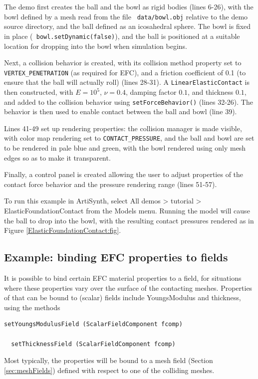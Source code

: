 \lstset{numbers=left} 
\iflatexml

\else

\fi
\lstset{numbers=none}

The demo first creates the ball and the bowl as rigid bodies (lines
6-26), with the bowl defined by a mesh read from the file {\tt
data/bowl.obj} relative to the demo source directory, and the ball
defined as an icosahedral sphere. The bowl is fixed in place ({\tt
bowl.setDynamic(false)}), and the ball is positioned at a suitable
location for dropping into the bowl when simulation begins.

Next, a collision behavior is created, with its collision {\sf method}
property set to {\tt VERTEX\_PENETRATION} (as required for EFC), and a
friction coefficient of 0.1 (to ensure that the ball will actually
roll) (lines 28-31). A {\tt LinearElasticContact} is then constructed,
with $E = 10^5$, $\nu=0.4$, damping factor $0.1$, and thickness $0.1$,
and added to the collision behavior using {\tt setForceBehavior()}
(lines 32-26). The behavior is then used to enable contact between the
ball and bowl (line 39).

Lines 41-49 set up rendering properties: the collision manager is made
visible, with color map rendering set to {\tt CONTACT\_PRESSURE}, and
the ball and bowl are set to be rendered in pale blue and green, with
the bowl rendered using only mesh edges so as to make it transparent.

Finally, a control panel is created allowing the user to adjust
properties of the contact force behavior and the pressure rendering
range (lines 51-57).

To run this example in ArtiSynth, select {\sf All demos > tutorial >
ElasticFoundationContact} from the {\sf Models} menu. Running the
model will cause the ball to drop into the bowl, with the resulting
contact pressures rendered as in
Figure \ref{ElasticFoundationContact:fig}.

\subsection{Example: binding EFC properties to fields}
\label{BindingEFCPropsToFields:sec}

It is possible to bind certain EFC material properties to a field, for
situations where these properties vary over the surface of the
contacting meshes. Properties of 
that can be bound to (scalar) fields include {\sf YoungsModulus} and
{\sf thickness}, using the methods 
%
\begin{lstlisting}[]
  setYoungsModulusField (ScalarFieldComponent fcomp)

  setThicknessField (ScalarFieldComponent fcomp)
\end{lstlisting}
%
Most typically, the properties will be bound to a mesh field
(Section \ref{sec:meshFields}) defined with respect to one of the
colliding meshes.


